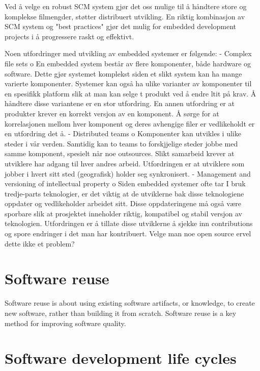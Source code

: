 Ved å velge en robust SCM system gjør det oss mulige til å håndtere store og komplekse filmengder, støtter distribuert utvikling. En riktig kombinasjon av SCM system og "best practices" gjør det mulig for embedded development projects i å progressere raskt og effektivt.


Noen utfordringer med utvikling av embedded systemer er følgende:
-	Complex file sets
o	En embedded system består av flere komponenter, både hardware og software. Dette gjør systemet komplekst siden et slikt system kan ha mange varierte komponenter. Systemer kan også ha ulike varianter av komponenter til en spesifikk platform slik at man kan selge t produkt ved å endre ltit på krav. Å håndtere disse variantene er en stor utfordring. En annen utfordring er at produkter krever en korrekt versjon av en komponent. Å sørge for at korrelasjonen mellom hver komponent og deres avhengige filer er vedlikeholdt er en utfordring det å.
-	Distributed teams
o	Komponenter kan utvikles i ulike steder i vår verden. Samtidig kan to teams to forskjjelige steder jobbe med samme komponent, spesielt når noe outsources. Slikt samarbeid krever at utviklere har adgang til hver andres arbeid. Utfordringen er at utviklere som jobber i hvert sitt sted (geografisk) holder seg synkronisert.
-	Management and versioning of intellectual property
o	Siden embedded systemer ofte tar I bruk tredje-parts teknologier, er det viktig at de utviklerne bak disse teknologiene oppdater og vedlikeholder arbeidet sitt. Disse oppdateringene må også være sporbare slik at prosjektet inneholder riktig, kompatibel og stabil versjon av teknologien. Utfordringen er å tillate disse utviklerne å sjekke inn contributions og spore endringer i det man har kontribuert. Velge man noe open source ervel dette ikke et problem?





\section{Software reuse}
Software reuse is about using existing software artifacts, or knowledge, to create new software, rather than building it from scratch. Software reuse is a key method for improving software quality. 


\section{Software development life cycles} %






